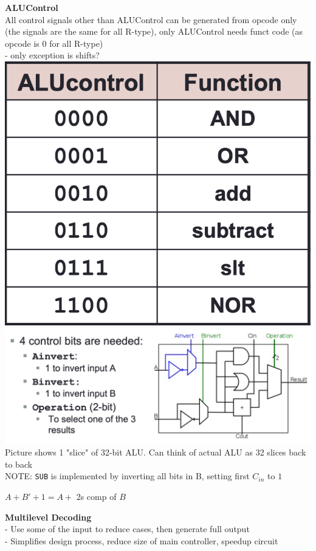 \documentclass[10pt, a4paper]{article}
\begin{document}
\begin{multicols*}{3}
		\textbf{ALUControl}\\
		All control signals other than ALUControl can be generated from opcode only (the signals are the same for all R-type), only ALUControl needs funct code (as opcode is 0 for all R-type)\\
		- only exception is shifts?\\
		\includegraphics[scale=0.25]{./assets/ALUControl}\\
		\includegraphics[scale=0.25]{./assets/ALUCircuit}\\
		Picture shows 1 "slice" of 32-bit ALU. Can think of actual ALU as 32 slices back to back\\
		NOTE: \texttt{SUB} is implemented by inverting all bits in B, setting first $C_{in}$ to $1$
		
		\centerline{$A + B' + 1 = A +$ 2s comp of $B$}
		
		\textbf{Multilevel Decoding}\\
		- Use some of the input to reduce cases, then generate full output\\
		- Simplifies design process, reduce size of main controller, speedup circuit\\
		

\end{multicols*}
\end{document}
